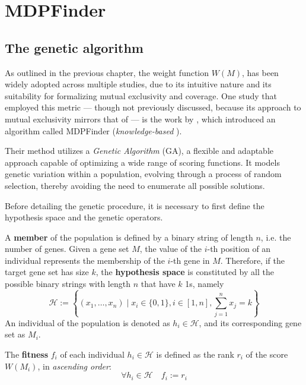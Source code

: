 \section{MDPFinder}

\subsection{The genetic algorithm}

As outlined in the previous chapter, the weight function $W(M)$, has been widely adopted across multiple studies, due to its intuitive nature and its suitability for formalizing mutual exclusivity and coverage. One study that employed this metric --- though not previously discussed, because its approach to mutual exclusivity mirrors that of \textcite{dendrix} --- is the work by \textcite{mdpfinder}, which introduced an algorithm called MDPFinder (\textit{knowledge-based} \cite{survey}).

Their method utilizes a \textit{Genetic Algorithm} (GA), a flexible and adaptable approach capable of optimizing a wide range of scoring functions. It models genetic variation within a population, evolving through a process of random selection, thereby avoiding the need to enumerate all possible solutions.

Before detailing the genetic procedure, it is necessary to first define the hypothesis space and the genetic operators.

\begin{definition}
    A \textbf{member} of the population is defined by a binary string of length $n$, i.e. the number of genes. Given a gene set $M$, the value of the $i$-th position of an individual represents the membership of the $i$-th gene in $M$. Therefore, if the target gene set has size $k$, the \textbf{hypothesis space} is constituted by all the possible binary strings with length $n$ that have $k$ 1s, namely $$\mathcal H := \left\{(x_1, \ldots, x_n) \mid x_i \in \{0, 1\}, i \in [1, n], \sum_{j = 1}^n {x_j} = k \right\}$$ An individual of the population is denoted as $h_i \in \mathcal H$, and its corresponding gene set as $M_i$.
\end{definition}

\begin{definition}
    The \textbf{fitness} $f_i$ of each individual $h_i \in \mathcal H$ is defined as the rank $r_i$ of the score $W(M_i)$, in \textit{ascending order}: $$\forall h_i \in \mathcal H \quad f_i := r_i$$
\end{definition}

